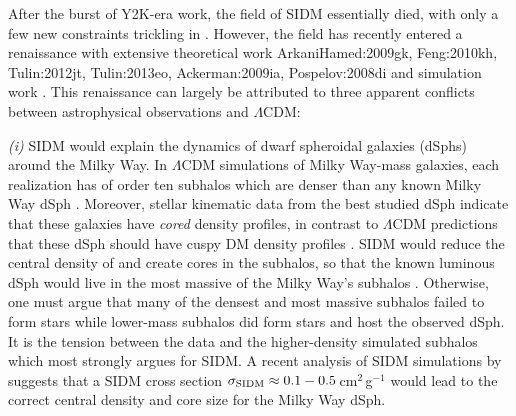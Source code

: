 After the burst of Y2K-era work, the field of SIDM essentially died, with only a few new constraints trickling in \citep{Randall:2008hs, Dawson:2012dl, Merten:2011gu}.
However, the field has recently entered a renaissance with extensive theoretical work {ArkaniHamed:2009gk, Feng:2010kh, Tulin:2012jt, Tulin:2013eo, Ackerman:2009ia, Pospelov:2008di} and simulation work \citep{Peter:2012vi, Rocha:2012tr, Vogelsberger:2012dy, Vogelsberger:2013bb, Zavala:2013iq}.
This renaissance can largely be attributed to three apparent conflicts between astrophysical observations and $\Lambda$CDM:

{\it (i)} SIDM would explain the dynamics of dwarf spheroidal
galaxies (dSphs) around the Milky Way.
In $\Lambda$CDM simulations of Milky Way-mass galaxies, each realization has
of order ten subhalos which are denser than any known Milky Way
dSph \citep{BoylanKolchin:2012id}.  Moreover, stellar kinematic data from
the best studied dSph indicate that these galaxies have \emph{cored}
density profiles, in contrast to $\Lambda$CDM predictions that
these dSph should have cuspy DM density
profiles \citep{Navarro:2004hi, Walker:2011eg, Wolf:2012vc}.
SIDM would reduce the central density of and create cores in the
subhalos, so that the known luminous dSph would live in the most
massive of the Milky Way's subhalos \citep{Rocha:2012tr}.  Otherwise, one
must argue that many of the densest and most massive subhalos failed
to form stars while lower-mass subhalos did form stars and host the
observed dSph.
It is the tension between the data and the higher-density simulated
subhalos which most strongly argues for SIDM.  A recent analysis of
SIDM simulations by \citet{Rocha:2012tr} suggests that a SIDM cross
section $\sigma_{\rm SIDM} \approx 0.1-0.5$\,cm$^2$\,g$^{-1}$ would lead to
the correct central density and core size for the Milky Way dSph.

